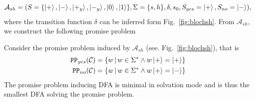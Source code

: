 \documentclass[../main.tex]{subfiles}
\begin{document}
\begin{equation}
    \mathcal{A}_{sh} = (S = \{\ket{+}, \ket{-}, \ket{+_y}, \ket{-_y}, \ket{0}, \ket{1}\}, \Sigma = \{s,h\}, \delta, s_0, S_{yes} = \ket{+}, S_{no} = \ket{-}),
\end{equation} where the transition function $\delta$ can be inferred form Fig.~\ref{fig:blochsh}.
From $\mathcal{A}_{sh}$, we construct the following promise problem
\begin{theorem}
\label{def:sh}
    Consider the promise problem induced by $\mathcal{A}_{sh}$ (see. Fig.~\ref{fig:blochsh}), that is 
    \begin{align}
                \mathtt{PP}_{yes}(\mathcal{C}) &= \{w \, | \, w \in \Sigma^* \land w \ket{+} = \ket{+} \} \\
                \mathtt{PP}_{no}(\mathcal{C}) &= \{w \, | \, w \in \Sigma^* \land w \ket{+} = \ket{-} \}   
    \end{align}
    The promise problem inducing DFA is minimal in solvation mode and is thus the smallest DFA solving the promise problem.
\end{theorem}
\end{document}

